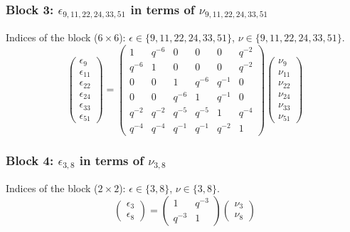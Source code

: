 \subsubsection{Block 3: $\epsilon_{9, 11, 22, 24, 33, 51}$ in terms of $\nu_{9, 11, 22, 24, 33, 51}$}
Indices of the block ($6\times 6$): $\epsilon \in \{9, 11, 22, 24, 33, 51\}$, $\nu \in \{9, 11, 22, 24, 33, 51\}$.
\[
\begin{pmatrix}
\epsilon_{9} \\
\epsilon_{11} \\
\epsilon_{22} \\
\epsilon_{24} \\
\epsilon_{33} \\
\epsilon_{51}
\end{pmatrix}
=
\begin{pmatrix}
1 & q^{-6} & 0 & 0 & 0 & q^{-2} \\
q^{-6} & 1 & 0 & 0 & 0 & q^{-2} \\
0 & 0 & 1 & q^{-6} & q^{-1} & 0 \\
0 & 0 & q^{-6} & 1 & q^{-1} & 0 \\
q^{-2} & q^{-2} & q^{-5} & q^{-5} & 1 & q^{-4} \\
q^{-4} & q^{-4} & q^{-1} & q^{-1} & q^{-2} & 1
\end{pmatrix}
\begin{pmatrix}
\nu_{9} \\
\nu_{11} \\
\nu_{22} \\
\nu_{24} \\
\nu_{33} \\
\nu_{51}
\end{pmatrix}
\]

\subsubsection{Block 4: $\epsilon_{3, 8}$ in terms of $\nu_{3, 8}$}
Indices of the block ($2\times 2$): $\epsilon \in \{3, 8\}$, $\nu \in \{3, 8\}$.
\[
\begin{pmatrix}
\epsilon_{3} \\
\epsilon_{8}
\end{pmatrix}
=
\begin{pmatrix}
1 & q^{-3} \\
q^{-3} & 1
\end{pmatrix}
\begin{pmatrix}
\nu_{3} \\
\nu_{8}
\end{pmatrix}
\]


